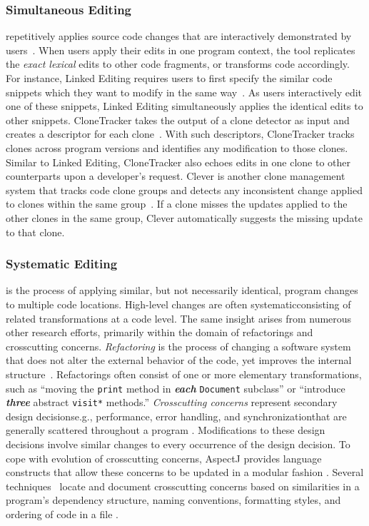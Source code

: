 \documentclass[runningheads,a4paper]{llncs}
\newcommand{\codefont}[1]{\footnotesize{\texttt{#1}}\normalsize}
\begin{document}
\subsubsection{Simultaneous Editing} repetitively applies source code changes that are interactively demonstrated by users~\cite{MiM2001}. When users apply their edits in one program context, the tool replicates the \emph{exact lexical} edits to other code fragments, or transforms code accordingly. For instance, Linked Editing requires users to first specify the similar code snippets which they want to modify in the same way~\cite{TBG2004}. As users interactively edit one of these snippets, Linked Editing simultaneously applies the identical edits to other snippets. 
CloneTracker takes the output of a clone detector as input and creates a descriptor for each clone~\cite{DuR2007}. With such descriptors, CloneTracker tracks clones across program versions and identifies any modification to those clones. 
Similar to Linked Editing, CloneTracker also echoes edits in one clone to other counterparts upon a developer's request. 
Clever is another clone management system that tracks code clone groups and detects any inconsistent change applied to clones within the same group~\cite{NNP2009}. If a clone misses the updates applied to the other clones in the same group, Clever automatically suggests the missing update to that clone.

\subsubsection{Systematic Editing} is the process of applying similar, but not necessarily identical, program changes to multiple code locations. 
High-level changes are often systematic\textemdash consisting of related transformations at a code level. The same insight arises from numerous other research efforts, primarily within the domain of refactorings and crosscutting concerns. {\em Refactoring} is the process of changing a software system that does not alter the external behavior of the code, yet improves the internal structure~\cite{Fowler2000, Griswold1991, Mens2004, Opdyke1992}. Refactorings often consist of one or more elementary transformations, such as ``moving the \codefont{print} method in {\bf \em each} \codefont{Document} subclass'' or ``introduce {\bf \em three} abstract \codefont{visit*} methods.'' {\em Crosscutting concerns} represent secondary design decisions\textemdash e.g., performance, error handling, and synchronization\textemdash that are generally scattered throughout a program \cite{Kiczales1997, Tarr1999}. Modifications to these design decisions involve similar changes to every occurrence of the design decision. To cope with evolution of crosscutting concerns, AspectJ provides language constructs that allow these concerns to be updated in a modular fashion \cite{Kiczales2001}. Several techniques~\cite{Breu2006, Dagenais2007} locate and document crosscutting concerns based on similarities in a program's dependency structure, naming conventions, formatting styles, and ordering of code in a file \cite{Griswold2001}. 
\end{document}
